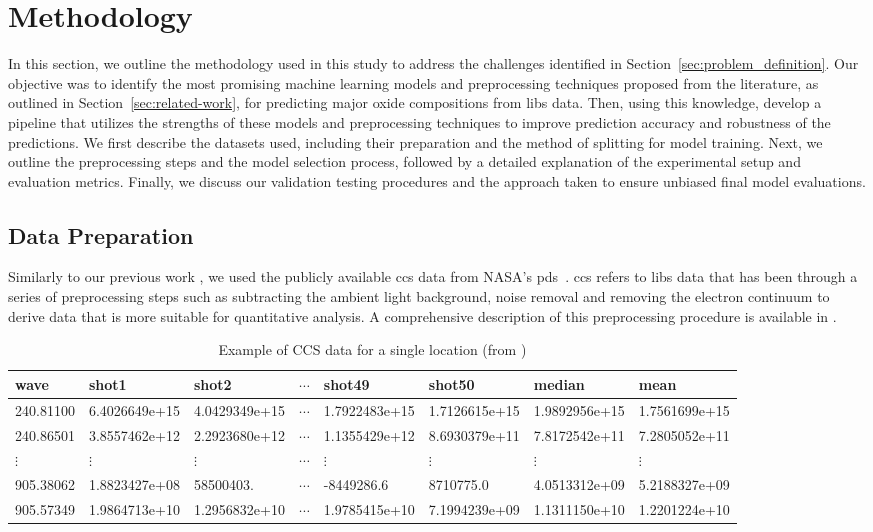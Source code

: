 \section{Methodology}\label{sec:methodology}
In this section, we outline the methodology used in this study to address the challenges identified in Section~\ref{sec:problem_definition}. Our objective was to identify the most promising machine learning models and preprocessing techniques proposed from the literature, as outlined in Section~\ref{sec:related-work}, for predicting major oxide compositions from \gls{libs} data.
Then, using this knowledge, develop a pipeline that utilizes the strengths of these models and preprocessing techniques to improve prediction accuracy and robustness of the predictions.
We first describe the datasets used, including their preparation and the method of splitting for model training. Next, we outline the preprocessing steps and the model selection process, followed by a detailed explanation of the experimental setup and evaluation metrics. Finally, we discuss our validation testing procedures and the approach taken to ensure unbiased final model evaluations.


\subsection{Data Preparation}
Similarly to our previous work \citet{p9_paper}, we used the publicly available \gls{ccs} data from NASA's \gls{pds}~\cite{PDSGeoscienceNode}.
\gls{ccs} refers to \gls{libs} data that has been through a series of preprocessing steps such as subtracting the ambient light background, noise removal and removing the electron continuum to derive data that is more suitable for quantitative analysis.
A comprehensive description of this preprocessing procedure is available in \citet{wiensPreflightCalibrationInitial2013}.

\begin{table*}[h]
\centering
\begin{tabular}{llllllll}
\toprule
     wave &         shot1 &         shot2 &  $\cdots$ &        shot49 &       shot50  & median        & mean          \\
\midrule
240.81100 & 6.4026649e+15 & 4.0429349e+15 & $\cdots$  & 1.7922483e+15 & 1.7126615e+15 & 1.9892956e+15 & 1.7561699e+15 \\
240.86501 & 3.8557462e+12 & 2.2923680e+12 & $\cdots$  & 1.1355429e+12 & 8.6930379e+11 & 7.8172542e+11 & 7.2805052e+11 \\
$\vdots$  & $\vdots$      & $\vdots$      & $\cdots$  & $\vdots$      & $\vdots$      & $\vdots$      & $\vdots$      \\
905.38062 & 1.8823427e+08 & 58500403.     & $\cdots$  & -8449286.6    & 8710775.0     & 4.0513312e+09 & 5.2188327e+09 \\
905.57349 & 1.9864713e+10 & 1.2956832e+10 & $\cdots$  & 1.9785415e+10 & 7.1994239e+09 & 1.1311150e+10 & 1.2201224e+10 \\
\bottomrule
\end{tabular}
\caption{Example of CCS data for a single location (from \citet{p9_paper})}
\label{tab:ccs_data_example}
\end{table*}

